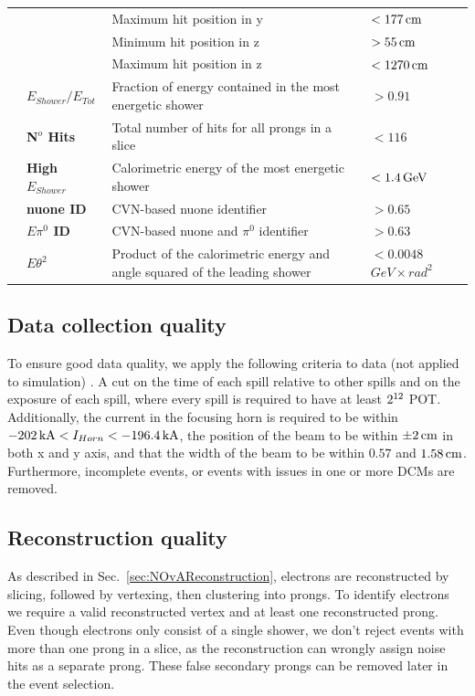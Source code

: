 \begin{table}[!hb]
\begin{tabular}{|m{2mm} m{} m{} m{}|}
& & Maximum hit position in y & $<\unit[177]{cm}$\\
& & Minimum hit position in z & $>\unit[55]{cm}$\\
& & Maximum hit position in z & $<\unit[1270]{cm}$\\\hline
\parbox[t]{2mm}{} &
\textbf{$E_{Shower}/E_{Tot}$} & Fraction of energy contained in the most energetic shower & $>0.91$\\
& \textbf{N$^o$ Hits} & Total number of hits for all prongs in a slice & $<116$\\
& \textbf{High $E_{Shower}$} & Calorimetric energy of the most energetic shower & $<\unit[1.4]{GeV}$\\
& \textbf{\gls{nuone} ID} & \gls{CVN}-based \gls{nuone} identifier & $>0.65$\\
& \textbf{$E\pi^0$ ID} & \gls{CVN}-based \gls{nuone} and $\pi^0$ identifier & $>0.63$\\
& \textbf{$E\theta^2$} & Product of the calorimetric energy and angle squared of the leading shower & $<0.0048$ $\unit{GeV\times rad^2}$\\\hline
\end{tabular}
\label{tab:EventSelectionSummary}
\end{table}

\subsection{Data collection quality}\label{sec:NuMMEventSelSpillCuts}
To ensure good data quality, we apply the following criteria to data (not applied to simulation) \cite{NOvA-doc-59876}. A cut on the time of each spill relative to other spills and on the exposure of each spill, where every spill is required to have at least $2\time10^{12}$ \gls{POT}. Additionally, the current in the focusing horn is required to be within $\unit[-202]{kA}<I_{Horn}<\unit[-196.4]{kA}$, the position of the beam to be within $\pm\unit[2]{cm}$ in both x and y axis, and that the width of the beam to be within $0.57$ and $\unit[1.58]{cm}$. Furthermore, incomplete events, or events with issues in one or more \glspl{DCM} are removed.

\subsection{Reconstruction quality}\label{sec:NuMMEventSelRecoQC}
As described in Sec.~\ref{sec:NOvAReconstruction}, electrons are reconstructed by slicing, followed by vertexing, then clustering into prongs. To identify electrons we require a valid reconstructed vertex and at least one reconstructed prong. Even though electrons only consist of a single shower, we don't reject events with more than one prong in a slice, as the reconstruction can wrongly assign noise hits as a separate prong. These false secondary prongs can be removed later in the event selection.

